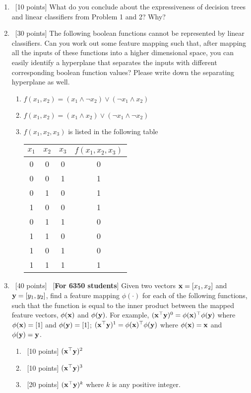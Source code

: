 \documentclass[12pt, fullpage,letterpaper]{article}
\begin{document}
\begin{enumerate}
\item~[10 points] What do you conclude about the expressiveness of decision trees and linear classifiers from Problem 1 and 2? Why? 


\item~[30 points] The following boolean functions cannot be represented by linear classifiers. Can you work out some feature mapping such that, after mapping all the inputs of these functions into a higher dimensional space, you can easily identify a hyperplane that separates the inputs with different corresponding boolean function values? Please write down the separating hyperplane as well. 
\begin{enumerate}
\item $f(x_1, x_2) = (x_1 \land \neg x_2) \lor (\neg x_1 \land x_2) $
\item $f(x_1, x_2) = (x_1 \land x_2) \lor (\neg x_1 \land \neg x_2)$
\item $f(x_1, x_2, x_3)$ is listed in the following table
\begin{table}[h]
        \centering
        \begin{tabular}{ccc|c}
        $x_1$ & $x_2$ & $x_3$ &  $f(x_1, x_2, x_3)$\\ 
        \hline\hline
         0 & 0 & 0 & 0 \\ \hline
         0 & 0 & 1 & 1 \\ \hline
         0 & 1 & 0 & 1 \\ \hline
         1 & 0 & 0 & 1 \\ \hline
         0 & 1 & 1 & 0\\ \hline
         1 & 1 & 0 & 0\\ \hline
         1 & 0 & 1 & 0\\ \hline
         1 & 1 & 1 & 1\\ \hline
        \end{tabular}
\end{table}
\end{enumerate}

\item~[40 points] ~[\textbf{For 6350 students}] Given two vectors ${\bf x} = [x_1,  x_2]$ and ${\bf y}=[y_1,  y_2]$, find a feature mapping $\phi(\cdot)$ for each of the following functions, such that the function is equal to the inner product between the mapped feature vectors, $\phi({\bf x})$ and $\phi({\bf y})$. For example, $({\bf x}^\top {\bf y})^0 = \phi({\bf x})^\top \phi({\bf y})$ where $\phi({\bf x}) = [1]$ and $\phi({\bf y}) = [1]$; $({\bf x}^\top {\bf y})^1 = \phi({\bf x})^\top \phi({\bf y})$ where $\phi({\bf x}) = {\bf x}$ and $\phi({\bf y}) = {\bf y}$. 
\begin{enumerate}
\item~[10 points] $({\bf x}^\top {\bf y})^2$
\item~[10 points] $({\bf x}^\top {\bf y})^3$
\item~[20 points] $({\bf x}^\top {\bf y})^k$ where $k$ is  any positive integer.  
\end{enumerate}
\end{enumerate}
\end{document}
